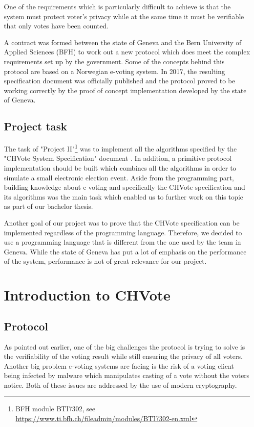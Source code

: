\documentclass[a4paper,12pt]{report}
\begin{document}
One of the requirements which is particularly difficult to achieve is that the system must protect voter's privacy while at the same time it must be verifiable that only votes have been counted.

A contract was formed between the state of Geneva and the Bern University of Applied Sciences (BFH) to work out a new protocol which does meet the complex requirements set up by the government. Some of the concepts behind this protocol are based on a Norwegian e-voting system. In 2017, the resulting specification document was officially published and the protocol proved to be working correctly by the proof of concept implementation developed by the state of Geneva.

\section{Project task}
The task of "Project II"\footnote{BFH module BTI7302, see \url{https://www.ti.bfh.ch/fileadmin/modules/BTI7302-en.xml}} was to implement all the algorithms specified by the "CHVote System Specification" document \cite{chvote}. In addition, a primitive protocol implementation should be built which combines all the algorithms in order to simulate a small electronic election event. Aside from the programming part, building knowledge about e-voting and specifically the CHVote specification and its algorithms was the main task which enabled us to further work on this topic as part of our bachelor thesis.

Another goal of our project was to prove that the CHVote specification can be implemented regardless of the programming language. Therefore, we decided to use a programming language that is different from the one used by the team in Geneva. While the state of Geneva has put a lot of emphasis on the performance of the system, performance is not of great relevance for our project.

\chapter{Introduction to CHVote}
\section{Protocol}
As pointed out earlier, one of the big challenges the protocol is trying to solve is the verifiability of the voting result while still ensuring the privacy of all voters. Another big problem e-voting systems are facing is the risk of a voting client being infected by malware which manipulates casting of a vote without the voters notice. Both of these issues are addressed by the use of modern cryptography.
\end{document}
